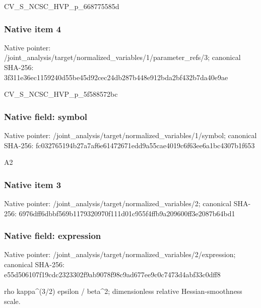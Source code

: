 \documentclass[10pt,a4paper]{article}
\begin{document}
\begingroup\raggedright\sloppy CV\_\allowbreak{}S\_\allowbreak{}NCSC\_\allowbreak{}HVP\_\allowbreak{}p\_\allowbreak{}668775585d\par\endgroup

\subsubsection{Native item 4}
Native pointer: /joint\_\allowbreak{}analysis/target/normalized\_\allowbreak{}variables/1/parameter\_\allowbreak{}refs/3; canonical SHA-256: 3f311e36ec1159240d55be45d92cec24db287b448e912bda2bf432b7da40e9ae

\begingroup\raggedright\sloppy CV\_\allowbreak{}S\_\allowbreak{}NCSC\_\allowbreak{}HVP\_\allowbreak{}p\_\allowbreak{}5f588572bc\par\endgroup

\subsubsection{Native field: symbol}
Native pointer: /joint\_\allowbreak{}analysis/target/normalized\_\allowbreak{}variables/1/symbol; canonical SHA-256: fc032765194b27a7af6e61472671edd9a55cae4019c6f63ee6a1bc4307b1f653

\begingroup\raggedright\sloppy A2\par\endgroup

\subsubsection{Native item 3}
Native pointer: /joint\_\allowbreak{}analysis/target/normalized\_\allowbreak{}variables/2; canonical SHA-256: 6976dff6dbbf569b1179320970f111d01c955f4ffb9a209600ff3e2087b64bd1

\subsubsection{Native field: expression}
Native pointer: /joint\_\allowbreak{}analysis/target/normalized\_\allowbreak{}variables/2/expression; canonical SHA-256: e55d506107f19cdc2323302f9ab9078f98c9ad677ee9c0c7473d4abf33c0dff8

\begingroup\raggedright\sloppy rho kappa\textasciicircum{}(3/\allowbreak{}2) epsilon /\allowbreak{} beta\textasciicircum{}2;\allowbreak{} dimensionless relative Hessian-smoothness scale.\par\endgroup
\end{document}
